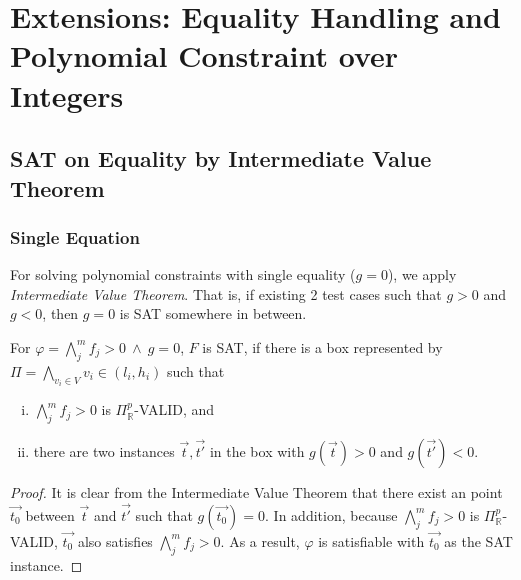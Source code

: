 \chapter{Extensions: Equality Handling and Polynomial Constraint over Integers} \label{chap:extension}

\section{SAT on Equality by Intermediate Value Theorem} \label{sec:eq}
\subsection*{Single Equation}
For solving polynomial constraints with single equality ($g=0$), we apply {\em Intermediate Value Theorem}. 
That is, if existing 2 test cases such that $g > 0$ and $g < 0$, then $g=0$ is SAT somewhere in between. 

\begin{lemma} \label{lemma:ivt}
For $\varphi = \bigwedge \limits_{j}^m f_j > 0~\wedge~g = 0$, $F$ is SAT, if 
there is a box represented by $\Pi = \bigwedge\limits_{v_i \in V}v_i \in (l_i, h_i)$ such that
\begin{enumerate}[(i)]
\item $\bigwedge \limits_{j}^m f_j > 0$ is $\Pi^p_\mathbb{R}$-VALID, and 
\item there are two instances $\vec{t},\vec{t'}$ in the box with $g(\vec{t}) > 0$ and $g(\vec{t'}) < 0$.
\end{enumerate}
\end{lemma}

\begin{proof}
It is clear from the Intermediate Value Theorem that there exist an point $\vec{t_0}$ between $\vec{t}$ and $\vec{t'}$ such that $g(\vec{t_0}) = 0$. In addition, because $\bigwedge \limits_{j}^m f_j > 0$ is $\Pi^p_\mathbb{R}$-VALID, $\vec{t_0}$ also satisfies $\bigwedge \limits_{j}^m f_j > 0$. As a result, $\varphi$ is satisfiable with $\vec{t_0}$ as the SAT instance.
\end{proof}

